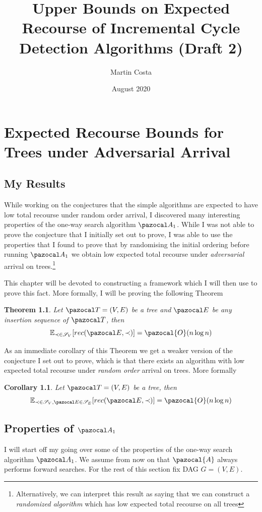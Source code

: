 \documentclass{report}
\title{Upper Bounds on Expected Recourse of Incremental Cycle Detection Algorithms (Draft 2)}
\author{Martin Costa}
\date{August 2020}
\newtheorem{theorem}{Theorem}
\newtheorem{corollary}{Corollary}
\begin{document}
\chapter{Expected Recourse Bounds for Trees under Adversarial Arrival}

\section{My Results}

While working on the conjectures that the simple algorithms are expected to have low total recourse under random order arrival, I discovered many interesting properties of the one-way search algorithm $\pazocal A_1$. While I was not able to prove the conjecture that I initially set out to prove, I was able to use the properties that I found to prove that by randomising the initial ordering before running $\pazocal A_1$ we obtain low expected total recourse under \textit{adversarial} arrival on trees.\footnote{Alternatively, we can interpret this result as saying that we can construct a \textit{randomized algorithm} which has low expected total recourse on all trees}

This chapter will be devoted to constructing a framework which I will then use to prove this fact. More formally, I will be proving the following Theorem

\begin{theorem}
Let $\pazocal T = (V,E)$ be a tree and $\pazocal E$ be any insertion sequence of $\pazocal T$, then
\[ \mathbb{E}_{\prec \in \mathcal S_V}[ rec(\pazocal E, \prec)] = \pazocal{O}(n\log n) \]
\end{theorem}

As an immediate corollary of this Theorem we get a weaker version of the conjecture I set out to prove, which is that there exists an algorithm with low expected total recourse under \textit{random order} arrival on trees. More formally

\begin{corollary}
Let $\pazocal T = (V,E)$ be a tree, then
\[ \mathbb{E}_{\prec \in \mathcal S_V, \pazocal E \in \mathcal S_E}[ rec(\pazocal E, \prec)] = \pazocal{O}(n\log n) \]
\end{corollary}

\section{Properties of $\pazocal A_1$}

I will start off my going over some of the properties of the one-way search algorithm $\pazocal A_1$. We assume from now on that $\pazocal{A}$ always performs forward searches. For the rest of this section fix DAG $G=(V,E)$.
\end{document}
